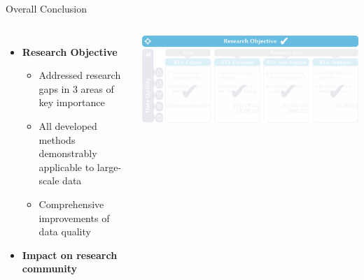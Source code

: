 \documentclass[en,16:9,smallfoot]{sdqbeamer}
\begin{document}
   \begin{frame}{Overall Conclusion}

   \begin{columns}
        \begin{itemize}
            \item \textbf{Research Objective}
            \begin{itemize}
                \item Addressed research gaps in 3 areas of key importance
                \item All developed methods demonstrably applicable to large-scale data
                \item Comprehensive improvements of data quality
            \end{itemize}
            \item \textbf{Impact on research community}
        \end{itemize}
            \includegraphics[width=\linewidth]{imgs/objective_grid_and_contrib_conclusion_ro}
   \end{columns}
   \end{frame}
\end{document}
